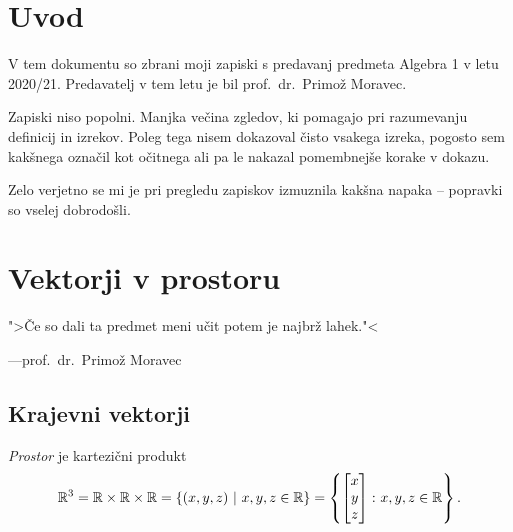 \documentclass[12pt, a4paper]{article}
\begin{document}
\renewcommand{\headheight}{20pt}

\maketitle

\newpage

\tableofcontents

\newpage

\renewcommand{\arraystretch}{1}

\section*{Uvod}

V tem dokumentu so zbrani moji zapiski s predavanj predmeta Algebra 1 v letu 2020/21. Predavatelj v tem letu je bil prof.~dr.~Primož Moravec.

Zapiski niso popolni. Manjka večina zgledov, ki pomagajo pri razumevanju definicij in izrekov. Poleg tega nisem dokazoval čisto vsakega izreka, pogosto sem kakšnega označil kot očitnega ali pa le nakazal pomembnejše korake v dokazu.

Zelo verjetno se mi je pri pregledu zapiskov izmuznila kakšna napaka -- popravki so vselej dobrodošli.

\newpage

\section{Vektorji v prostoru}

\epigraph{">Če so dali ta predmet meni učit potem je najbrž lahek."<}{---prof.~dr.~Primož Moravec}

\subsection{Krajevni vektorji}

\begin{okvir}
\begin{definicija}
\emph{Prostor} je kartezični produkt
\[
\mathbb{R}^3=\mathbb{R}\times\mathbb{R}\times\mathbb{R}
=\left\{(x, y, z)~\middle\vert~x,y,z\in\mathbb{R}\right\}
=\left\{
\begin{bmatrix}
x \\
y \\
z
\end{bmatrix}
\colon x,y,z\in\mathbb{R}\right\}.
\]
\end{definicija}
\end{okvir}
\end{document}
